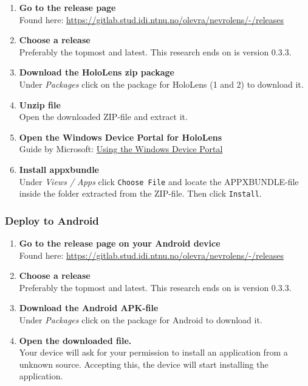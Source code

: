 \begin{enumerate}
    \item {
        \textbf{Go to the release page}\\
        Found here: \url{https://gitlab.stud.idi.ntnu.no/olevra/nevrolens/-/releases}
    }
    \item {
        \textbf{Choose a release}\\
        Preferably the topmost and latest. This research ends on is version 0.3.3. 
    }

    \item {
        \textbf{Download the HoloLens zip package}\\
        Under \textit{Packages} click on the package for HoloLens (1 and 2) to download it.
    }

    \item {
        \textbf{Unzip file}\\
        Open the downloaded ZIP-file and extract it.
    }

    \item {
        \textbf{Open the Windows Device Portal for HoloLens}\\
        Guide by Microsoft: \href{https://docs.microsoft.com/en-us/windows/mixed-reality/develop/platform-capabilities-and-apis/using-the-windows-device-portal}{Using the Windows Device Portal}
    }
    \item {
        \textbf{Install appxbundle}\\
        Under \textit{Views / Apps} click \texttt{Choose File} and locate the APPXBUNDLE-file inside the folder extracted from the ZIP-file. Then click \texttt{Install}.
    }

\end{enumerate}

\subsubsection{Deploy to Android}

\begin{enumerate}
    \item {
        \textbf{Go to the release page on your Android device}\\
        Found here: \url{https://gitlab.stud.idi.ntnu.no/olevra/nevrolens/-/releases}
    }
    \item {
        \textbf{Choose a release}\\
        Preferably the topmost and latest. This research ends on is version 0.3.3. 
    }

    \item {
        \textbf{Download the Android APK-file}\\
        Under \textit{Packages} click on the package for Android to download it.
    }

    \item {
        \textbf{Open the downloaded file.}\\
        Your device will ask for your permission to install an application from a unknown source. Accepting this, the device will start installing the application.
    }

\end{enumerate}

